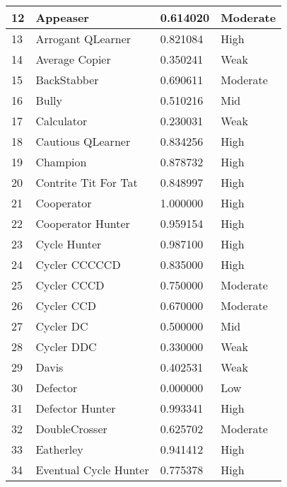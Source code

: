 \begin{longtable}{|p{0.5cm}||p{6cm}||p{4cm}||p{2cm}|}
			12  & Appeaser                    & 0.614020          & Moderate \\ \hline
			13  & Arrogant QLearner           & 0.821084          & High     \\ \hline
			14  & Average Copier              & 0.350241          & Weak     \\ \hline
			15  & BackStabber                 & 0.690611          & Moderate \\ \hline
			16  & Bully                       & 0.510216          & Mid     \\ \hline
			17  & Calculator                  & 0.230031          & Weak     \\ \hline
			18  & Cautious QLearner           & 0.834256          & High     \\ \hline
			19  & Champion                    & 0.878732          & High     \\ \hline
			20  & Contrite Tit For Tat        & 0.848997          & High     \\ \hline
			21  & Cooperator                  & 1.000000          & High     \\ \hline
			22  & Cooperator Hunter           & 0.959154          & High     \\ \hline
			23  & Cycle Hunter                & 0.987100          & High     \\ \hline
			24  & Cycler CCCCCD               & 0.835000          & High     \\ \hline
			25  & Cycler CCCD                 & 0.750000          & Moderate \\ \hline
			26  & Cycler CCD                  & 0.670000          & Moderate \\ \hline
			27  & Cycler DC                   & 0.500000          & Mid     \\ \hline
			28  & Cycler DDC                  & 0.330000          & Weak     \\ \hline
			29  & Davis                       & 0.402531          & Weak     \\ \hline
			30  & Defector                    & 0.000000          & Low      \\ \hline
			31  & Defector Hunter             & 0.993341          & High     \\ \hline
			32  & DoubleCrosser               & 0.625702          & Moderate \\ \hline
			33  & Eatherley                   & 0.941412          & High     \\ \hline
			34  & Eventual Cycle Hunter       & 0.775378          & High     \\ \hline

\end{longtable}

